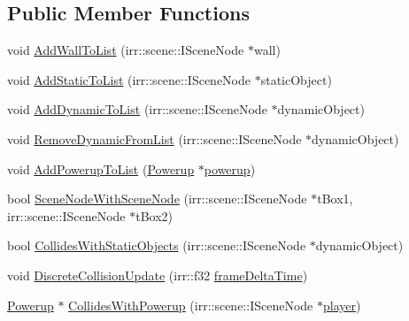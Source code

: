 \subsection*{Public Member Functions}
\begin{DoxyCompactItemize}
\item 
void \hyperlink{class_collision_a6570dc446e23b8a5b4631ca632ea8a64}{Add\-Wall\-To\-List} (irr\-::scene\-::\-I\-Scene\-Node $\ast$wall)
\item 
void \hyperlink{class_collision_a673528880f1ad75dab13a2107a3d2b7c}{Add\-Static\-To\-List} (irr\-::scene\-::\-I\-Scene\-Node $\ast$static\-Object)
\item 
void \hyperlink{class_collision_a48551c4c00be185dc16cf27775bd177b}{Add\-Dynamic\-To\-List} (irr\-::scene\-::\-I\-Scene\-Node $\ast$dynamic\-Object)
\item 
void \hyperlink{class_collision_af6fe5888d934195d15e51f237fc989c6}{Remove\-Dynamic\-From\-List} (irr\-::scene\-::\-I\-Scene\-Node $\ast$dynamic\-Object)
\item 
void \hyperlink{class_collision_affd296ad667fec8f353265488e4de292}{Add\-Powerup\-To\-List} (\hyperlink{class_powerup}{Powerup} $\ast$\hyperlink{_power_up_spawner_8cpp_ae69e278d6b99e84c0db1ecaf769b3f39}{powerup})
\item 
bool \hyperlink{class_collision_aa2fa3418899ac7948b31eb909dea6f04}{Scene\-Node\-With\-Scene\-Node} (irr\-::scene\-::\-I\-Scene\-Node $\ast$t\-Box1, irr\-::scene\-::\-I\-Scene\-Node $\ast$t\-Box2)
\item 
bool \hyperlink{class_collision_a334467ec1c8b7889aa46016fcedb13f9}{Collides\-With\-Static\-Objects} (irr\-::scene\-::\-I\-Scene\-Node $\ast$dynamic\-Object)
\item 
void \hyperlink{class_collision_a17f9c89abcc19bfb3fe0357158dae55d}{Discrete\-Collision\-Update} (irr\-::f32 \hyperlink{_player_8cpp_adc988571147642cda93afbf89783f9c9}{frame\-Delta\-Time})
\item 
\hyperlink{class_powerup}{Powerup} $\ast$ \hyperlink{class_collision_a75da9eaaa278f192d163db0065d33483}{Collides\-With\-Powerup} (irr\-::scene\-::\-I\-Scene\-Node $\ast$\hyperlink{_enemy_8cpp_a96781128d3743da3d17e0fdd91afba7b}{player})
\end{DoxyCompactItemize}


